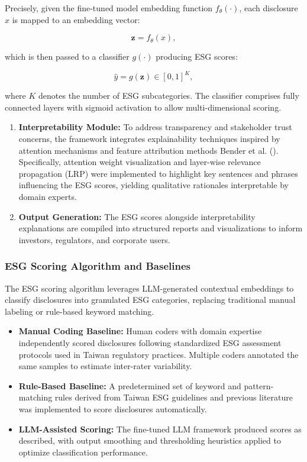 \documentclass[
  12pt,
]{article}
\begin{document}
Precisely, given the fine-tuned model embedding function
\(f_\theta(\cdot)\), each disclosure \(x\) is mapped to an embedding
vector:

\[
\mathbf{z} = f_\theta(x),
\]

which is then passed to a classifier \(g(\cdot)\) producing ESG scores:

\[
\hat{y} = g(\mathbf{z}) \in [0,1]^K,
\]

where \(K\) denotes the number of ESG subcategories. The classifier
comprises fully connected layers with sigmoid activation to allow
multi-dimensional scoring.

\begin{enumerate}
\def\labelenumi{\arabic{enumi}.}
\setcounter{enumi}{2}
\item
  \textbf{Interpretability Module:} To address transparency and
  stakeholder trust concerns, the framework integrates explainability
  techniques inspired by attention mechanisms and feature attribution
  methods Bender et al. (). Specifically,
  attention weight visualization and layer-wise relevance propagation
  (LRP) were implemented to highlight key sentences and phrases
  influencing the ESG scores, yielding qualitative rationales
  interpretable by domain experts.
\item
  \textbf{Output Generation:} The ESG scores alongside interpretability
  explanations are compiled into structured reports and visualizations
  to inform investors, regulators, and corporate users.
\end{enumerate}

\subsubsection{ESG Scoring Algorithm and
Baselines}\label{esg-scoring-algorithm-and-baselines}

The ESG scoring algorithm leverages LLM-generated contextual embeddings
to classify disclosures into granulated ESG categories, replacing
traditional manual labeling or rule-based keyword matching.

\begin{itemize}
\item
  \textbf{Manual Coding Baseline:} Human coders with domain expertise
  independently scored disclosures following standardized ESG assessment
  protocols used in Taiwan regulatory practices. Multiple coders
  annotated the same samples to estimate inter-rater variability.
\item
  \textbf{Rule-Based Baseline:} A predetermined set of keyword and
  pattern-matching rules derived from Taiwan ESG guidelines and previous
  literature was implemented to score disclosures automatically.
\item
  \textbf{LLM-Assisted Scoring:} The fine-tuned LLM framework produced
  scores as described, with output smoothing and thresholding heuristics
  applied to optimize classification performance.
\end{itemize}
\end{document}
